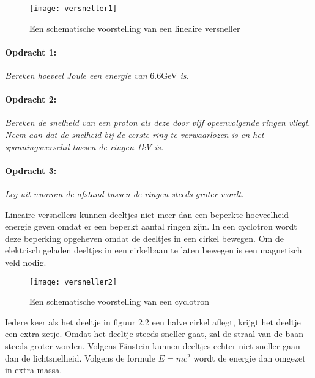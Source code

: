 \begin{figure}[h]
\noindent \begin{centering}
\texttt{[image: versneller1]}
\par\end{centering}

\caption{Een schematische voorstelling van een lineaire versneller}
\end{figure}



\paragraph*{Opdracht 1:}

\emph{Bereken hoeveel Joule een energie van }6.6GeV\emph{ is.}


\paragraph*{Opdracht 2:}

\emph{Bereken de snelheid van een proton als deze door vijf opeenvolgende
ringen vliegt. Neem aan dat de snelheid bij de eerste ring te verwaarlozen
is en het spanningsverschil tussen de ringen 1kV is.}


\paragraph*{Opdracht 3:}

\emph{Leg uit waarom de afstand tussen de ringen steeds groter wordt.}

Lineaire versnellers kunnen deeltjes niet meer dan een beperkte hoeveelheid
energie geven omdat er een beperkt aantal ringen zijn. In een cyclotron
wordt deze beperking opgeheven omdat de deeltjes in een cirkel bewegen.
Om de elektrisch geladen deeltjes in een cirkelbaan te laten bewegen
is een magnetisch veld nodig.

\begin{figure}[h]
\noindent \begin{centering}
\texttt{[image: versneller2]}
\par\end{centering}

\caption{Een schematische voorstelling van een cyclotron}
\end{figure}


Iedere keer als het deeltje in figuur 2.2 een halve cirkel aflegt,
krijgt het deeltje een extra zetje. Omdat het deeltje steeds sneller
gaat, zal de straal van de baan steeds groter worden. Volgens Einstein
kunnen deeltjes echter niet sneller gaan dan de lichtsnelheid. Volgens
de formule $E=mc^{2}$ wordt de energie dan omgezet in extra massa.


